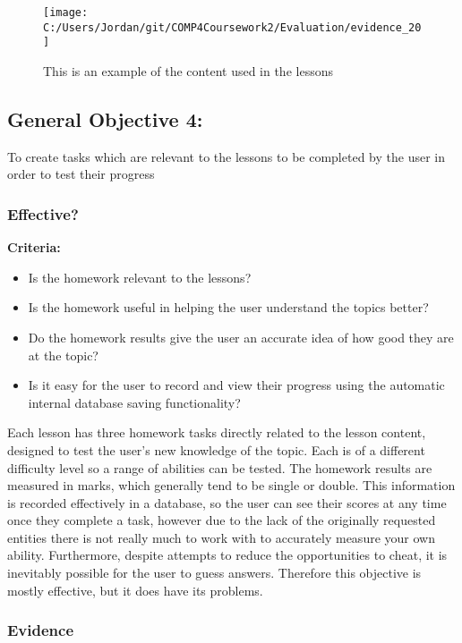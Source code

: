 \begin{figure}[H]
	\texttt{[image: C:/Users/Jordan/git/COMP4Coursework2/Evaluation/evidence\_20]}
	\caption{This is an example of the content used in the lessons}
\end{figure}

\subsection{General Objective 4: }

To create tasks which are relevant to the lessons to be completed by the user in order to test their progress

\subsubsection{Effective?}

\textbf{Criteria: }

\begin{itemize}
	\item Is the homework relevant to the lessons?
	\item Is the homework useful in helping the user understand the topics better?
	\item Do the homework results give the user an accurate idea of how good they are at the topic?
	\item Is it easy for the user to record and view their progress using the automatic internal database saving functionality?
\end{itemize}

Each lesson has three homework tasks directly related to the lesson content, designed to test the user's new knowledge of the topic. Each is of a different difficulty level so a range of abilities can be tested. The homework results are measured in marks, which generally tend to be single or double. This information is recorded effectively in a database, so the user can see their scores at any time once they complete a task, however due to the lack of the originally requested entities there is not really much to work with to accurately measure your own ability. Furthermore, despite attempts to reduce the opportunities to cheat, it is inevitably possible for the user to guess answers. Therefore this objective is mostly effective, but it does have its problems.

\subsubsection{Evidence}

